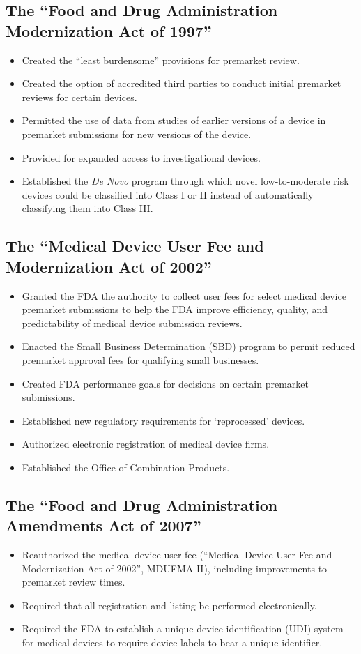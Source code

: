\documentclass[11pt]{book}
\begin{document}
\subsection{The ``Food and Drug Administration Modernization Act of 1997''}
\begin{itemize}
	\item Created the ``least burdensome'' provisions for premarket review.
	\item Created the option of accredited third parties to conduct initial premarket reviews for certain devices.
	\item Permitted the use of data from studies of earlier versions of a device in premarket submissions for new versions of the device.
	\item Provided for expanded access to investigational devices.
	\item Established the \textit{De Novo} program through which novel low-to-moderate risk devices could be classified into Class I or II instead of automatically classifying them into Class III.
\end{itemize}

\subsection{The ``Medical Device User Fee and Modernization Act of 2002''}
\begin{itemize}
	\item Granted the FDA the authority to collect user fees for select medical device premarket submissions to help the FDA improve efficiency, quality, and predictability of medical device submission reviews.
	\item Enacted the Small Business Determination (SBD) program to permit reduced premarket approval fees for qualifying small businesses.
	\item Created FDA performance goals for decisions on certain premarket submissions.
	\item Established new regulatory requirements for ‘reprocessed’ devices.
	\item Authorized electronic registration of medical device firms.
	\item Established the Office of Combination Products.
\end{itemize}


\subsection{The ``Food and Drug Administration Amendments Act of 2007''}
\begin{itemize}
	\item Reauthorized the medical device user fee (``Medical Device User Fee and Modernization Act of 2002'', MDUFMA II), including improvements to premarket review times.
	\item Required that all registration and listing be performed electronically.
	\item Required the FDA to establish a unique device identification (UDI) system for medical devices to require device labels to bear a unique identifier.
\end{itemize}
\end{document}
